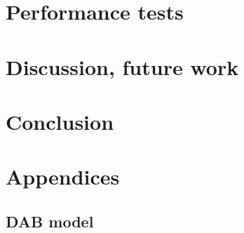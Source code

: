 \documentclass[11pt]{article}
\begin{document}
\section{Performance tests}






\section{Discussion, future work}



\section{Conclusion}


\section*{Appendices}

\subsection*{DAB model}
\end{document}
